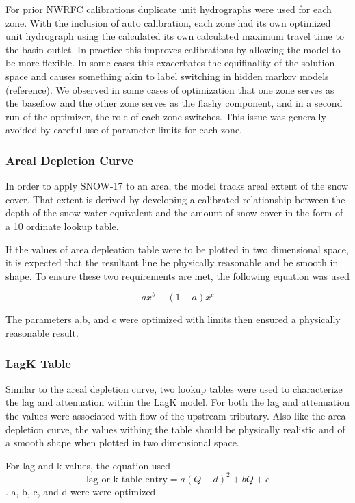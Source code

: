 \documentclass{agujournal2019}
\begin{document}
For prior NWRFC calibrations duplicate unit hydrographs were used for each zone. With the inclusion of auto calibration, each zone had its own optimized unit hydrograph using the calculated its own calculated maximum travel time to the basin outlet. In practice this improves calibrations by allowing the model to be more flexible. In some cases this exacerbates the equifinality of the solution space and causes something akin to label switching in hidden markov models (reference). We observed in some cases of optimization that one zone serves as the baseflow and the other zone serves as the flashy component, and in a second run of the optimizer, the role of each zone switches. This issue was generally avoided by careful use of parameter limits for each zone. 

\subsubsection{Areal Depletion Curve}

In order to apply SNOW-17 to an area, the model tracks areal extent of the snow cover. That extent is derived by developing a calibrated relationship between the depth of the snow water equivalent and the amount of snow cover in the form of a 10 ordinate lookup table. 

If the values of area depleation table were to be plotted in two dimensional space, it is expected that the resultant line be physically reasonable and be smooth in shape. To ensure these two requirements are met, the following equation was used

$$ax^b+(1-a)x^c$$ 

The parameters a,b, and c were optimized with limits then ensured a physically reasonable result.

\subsubsection{LagK Table}

Similar to the areal depletion curve, two lookup tables were used to characterize the lag and attenuation within the LagK model. For both the lag and attenuation the values were associated with flow of the upstream tributary. Also like the area depletion curve, the values withing the table should be physically realistic and of a smooth shape when plotted in two dimensional space. 

For lag and k values, the equation used $$\text{lag or k table entry}=a(Q-d)^{2}+bQ+c$$ . a, b, c, and d were were optimized. 
\end{document}

